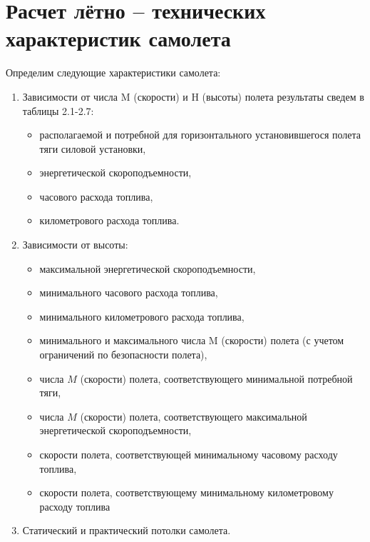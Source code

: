 \chapter{Расчет лётно – технических характеристик самолета}

Определим следующие характеристики самолета:
\begin{enumerate}
    \item Зависимости от числа M (скорости) и H (высоты) полета результаты
        сведем в таблицы 2.1-2.7:
    \begin{itemize}
    \item  располагаемой и потребной для горизонтального установившегося полета
    тяги силовой установки, 
    \item энергетической скороподъемности,
    \item часового расхода топлива,
    \item километрового расхода топлива.
    \end{itemize}
    \item Зависимости от высоты:
        \begin{itemize}
            \item максимальной энергетической скороподъемности,
            \item минимального часового расхода топлива,
            \item минимального километрового расхода топлива,
            \item минимального и максимального числа M (скорости) полета (с учетом
                ограничений по безопасности полета),
            \item числа $M$ (скорости) полета, соответствующего минимальной
                потребной тяги,
            \item числа $M$ (скорости) полета, соответствующего максимальной
                энергетической скороподъемности,
            \item скорости полета, соответствующей минимальному часовому расходу топлива,
            \item скорости полета, соответствующему минимальному километровому
                расходу топлива
        \end{itemize}
    \item Статический и практический потолки самолета.
\end{enumerate}

